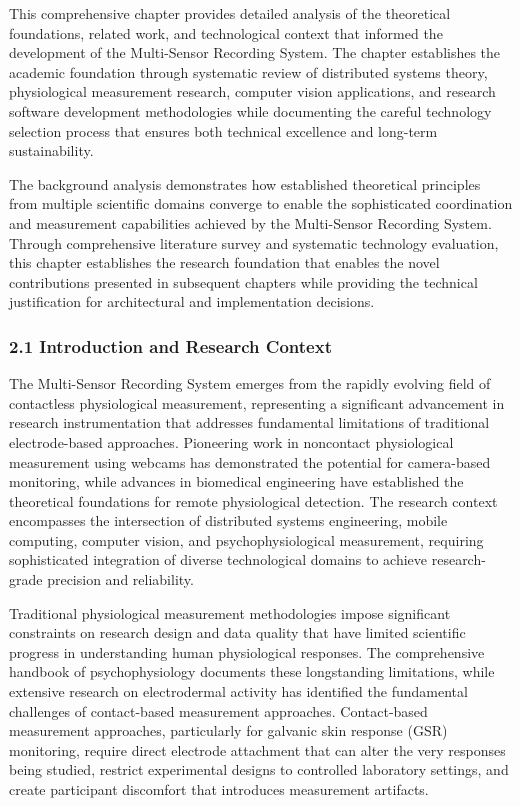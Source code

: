 \documentclass[12pt,a4paper]{report}
\begin{document}
This comprehensive chapter provides detailed analysis of the theoretical foundations, related work, and technological
context that informed the development of the Multi-Sensor Recording System. The chapter establishes the academic
foundation through systematic review of distributed systems theory, physiological measurement research, computer vision
applications, and research software development methodologies while documenting the careful technology selection process
that ensures both technical excellence and long-term sustainability.

The background analysis demonstrates how established theoretical principles from multiple scientific domains converge to
enable the sophisticated coordination and measurement capabilities achieved by the Multi-Sensor Recording System.
Through comprehensive literature survey and systematic technology evaluation, this chapter establishes the research
foundation that enables the novel contributions presented in subsequent chapters while providing the technical
justification for architectural and implementation decisions.

\subsubsection{2.1 Introduction and Research Context}

The Multi-Sensor Recording System emerges from the rapidly evolving field of contactless physiological measurement,
representing a significant advancement in research instrumentation that addresses fundamental limitations of traditional
electrode-based approaches. Pioneering work in noncontact physiological measurement using webcams has demonstrated the
potential for camera-based monitoring, while advances in biomedical engineering have established the theoretical
foundations for remote physiological detection. The research context encompasses the intersection of distributed systems
engineering, mobile computing, computer vision, and psychophysiological measurement, requiring sophisticated integration
of diverse technological domains to achieve research-grade precision and reliability.

Traditional physiological measurement methodologies impose significant constraints on research design and data quality
that have limited scientific progress in understanding human physiological responses. The comprehensive handbook of
psychophysiology documents these longstanding limitations, while extensive research on electrodermal activity has
identified the fundamental challenges of contact-based measurement approaches. Contact-based measurement approaches,
particularly for galvanic skin response (GSR) monitoring, require direct electrode attachment that can alter the very
responses being studied, restrict experimental designs to controlled laboratory settings, and create participant
discomfort that introduces measurement artifacts.
\end{document}
